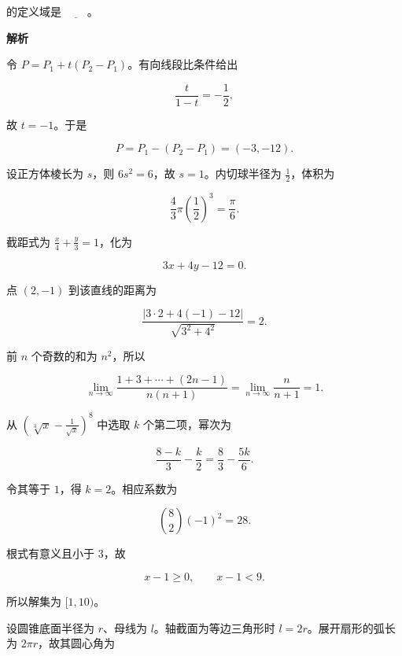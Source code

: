 \begin{answer}
的定义域是 $\underline{\hspace{2em}}$。

\textbf{解析}


令 $P=P_1+t(P_2-P_1)$。有向线段比条件给出

\nopagebreak[4]
\[
\frac{t}{1-t}=-\frac12,
\]

故 $t=-1$。于是

\nopagebreak[4]
\[
P=P_1-(P_2-P_1)=(-3,-12).
\]


设正方体棱长为 $s$，则 $6s^2=6$，故 $s=1$。内切球半径为 $\frac12$，体积为

\nopagebreak[4]
\[
\frac43\pi\left(\frac12\right)^3=\frac\pi6.
\]


截距式为 $\frac x4+\frac y3=1$，化为

\nopagebreak[4]
\[
3x+4y-12=0.
\]

点 $(2,-1)$ 到该直线的距离为

\nopagebreak[4]
\[
\frac{|3\cdot2+4(-1)-12|}{\sqrt{3^2+4^2}}=2.
\]


前 $n$ 个奇数的和为 $n^2$，所以

\nopagebreak[4]
\[
\lim_{n\to\infty}\frac{1+3+\cdots+(2n-1)}{n(n+1)}
=\lim_{n\to\infty}\frac n{n+1}=1.
\]


从 $\left(\sqrt[3]x-\frac1{\sqrt x}\right)^8$ 中选取 $k$ 个第二项，幂次为

\nopagebreak[4]
\[
\frac{8-k}{3}-\frac k2=\frac83-\frac{5k}{6}.
\]

令其等于 $1$，得 $k=2$。相应系数为

\nopagebreak[4]
\[
\binom82(-1)^2=28.
\]


根式有意义且小于 3，故

\nopagebreak[4]
\[
x-1\ge0,\qquad x-1<9.
\]

所以解集为 $[1,10)$。


设圆锥底面半径为 $r$、母线为 $l$。轴截面为等边三角形时 $l=2r$。展开扇形的弧长为 $2\pi r$，故其圆心角为


\end{answer}
